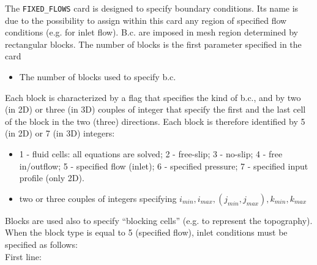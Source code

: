 The {\tt FIXED\_FLOWS} card is designed to specify boundary conditions. Its
name is due to the possibility to assign within this card any region of
specified flow conditions (e.g. for inlet flow). B.c. are imposed in 
mesh region determined by rectangular blocks. The number of blocks is the
first parameter specified in the card

\begin{itemize}
\item
{}
{The number of blocks used to specify b.c.}
\end{itemize}

Each block is characterized
by a flag that specifies the kind of b.c., and by two (in 2D) or three (in 3D)
couples of integer that specify the first and the last cell of the block in 
the two (three) directions. Each block is therefore identified by 5 (in 2D)
or 7 (in 3D) integers:\\

\begin{itemize}
\item
{}
{1 - fluid cells: all equations are solved; 2 - free-slip;
 3 - no-slip; 4 - free in/outflow; 5 - specified flow (inlet); 
 6 - specified pressure; 7 - specified input profile (only 2D).}

\item
{}
{two or three couples of integers specifying 
$ i_{min}, i_{max}, (j_{min}, j_{max}), k_{min}, k_{max}$ }

\end{itemize}

Blocks are used also to specify ``blocking cells'' (e.g. to 
represent the topography). When the block type is equal to 5 (specified
flow), inlet conditions must be specified as follows:\\

First line:

